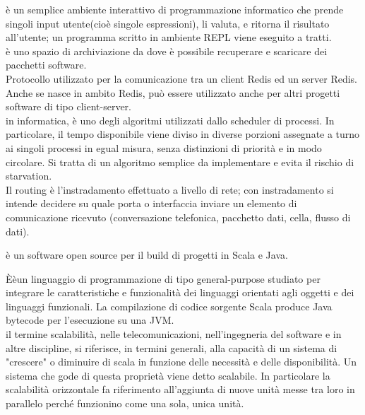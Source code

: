 \documentclass{scalatekids-article}
\begin{document}
   è un semplice ambiente interattivo di programmazione informatico che prende singoli input utente(cioè singole espressioni), li valuta, e ritorna il risultato all'utente; un programma scritto in ambiente REPL viene eseguito a tratti.
  \\

   è uno spazio di archiviazione da dove è possibile recuperare e scaricare dei pacchetti software.
  \\

   Protocollo utilizzato per la comunicazione tra un client Redis ed un server Redis. Anche se nasce in ambito Redis, può essere utilizzato anche per altri progetti software di tipo client-server.
  \\
  
   in informatica, è uno degli algoritmi utilizzati dallo scheduler di processi.
  In particolare, il tempo disponibile viene diviso in diverse porzioni assegnate a turno ai singoli processi in egual misura, senza distinzioni di priorità e in modo circolare.
  Si tratta di un algoritmo semplice da implementare e evita il rischio di starvation.
  \\

   Il routing è l'instradamento effettuato a livello di rete; con instradamento si intende decidere su quale porta o interfaccia inviare un elemento di comunicazione ricevuto (conversazione telefonica, pacchetto dati, cella, flusso di dati).
  \\


   è un software open source per il build di progetti in Scala e Java.

   Èèun linguaggio di programmazione di tipo general-purpose studiato per integrare le caratteristiche e funzionalità dei linguaggi orientati agli oggetti e dei linguaggi funzionali. La compilazione di codice sorgente Scala produce Java bytecode per l'esecuzione su una JVM.
  \\

   il termine scalabilità, nelle telecomunicazioni, nell'ingegneria del software e in altre discipline, si riferisce, in termini generali, alla capacità di un sistema di "crescere" o diminuire di scala in funzione delle necessità e delle disponibilità. Un sistema che gode di questa proprietà viene detto scalabile.
  In particolare la scalabilità orizzontale fa riferimento all’aggiunta di nuove unità messe tra loro in parallelo perché funzionino come una sola, unica unità.
  \\
\end{document}
